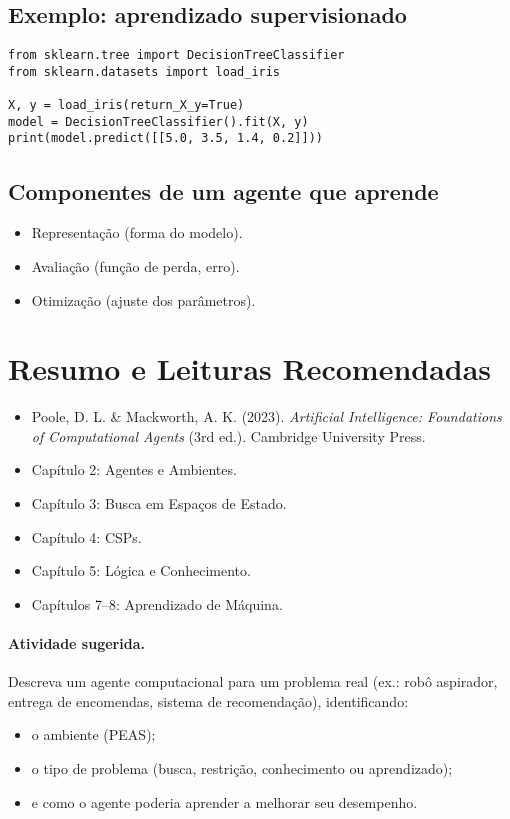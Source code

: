 \documentclass[9pt,a4paper]{extarticle}
\begin{document}
\subsection*{Exemplo: aprendizado supervisionado}
\begin{lstlisting}
from sklearn.tree import DecisionTreeClassifier
from sklearn.datasets import load_iris

X, y = load_iris(return_X_y=True)
model = DecisionTreeClassifier().fit(X, y)
print(model.predict([[5.0, 3.5, 1.4, 0.2]]))
\end{lstlisting}

\subsection*{Componentes de um agente que aprende}
\begin{itemize}
  \item Representação (forma do modelo).
  \item Avaliação (função de perda, erro).
  \item Otimização (ajuste dos parâmetros).
\end{itemize}

\section{Resumo e Leituras Recomendadas}

\begin{itemize}
  \item Poole, D. L. \& Mackworth, A. K. (2023). \textit{Artificial Intelligence: Foundations of Computational Agents} (3rd ed.). Cambridge University Press.
  \item Capítulo 2: Agentes e Ambientes.
  \item Capítulo 3: Busca em Espaços de Estado.
  \item Capítulo 4: CSPs.
  \item Capítulo 5: Lógica e Conhecimento.
  \item Capítulos 7–8: Aprendizado de Máquina.
\end{itemize}

\paragraph{Atividade sugerida.}
Descreva um agente computacional para um problema real (ex.: robô aspirador, entrega de encomendas, sistema de recomendação), identificando:
\begin{itemize}
  \item o ambiente (PEAS);
  \item o tipo de problema (busca, restrição, conhecimento ou aprendizado);
  \item e como o agente poderia aprender a melhorar seu desempenho.
\end{itemize}
\end{document}
